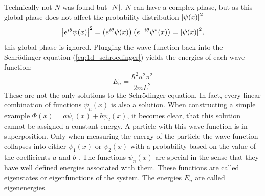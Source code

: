		Technically not $N$ was found but $\abs{N}$. $N$ can have a complex phase, but as this global phase does not affect the probability distribution $\abs{\psi(x)}^2$
		\begin{equation}
			\label{eq:global_phase}
			\abs{e^{i\theta}\psi(x)}^2=\left(e^{i\theta}\psi(x)\right)\left(e^{-i\theta}\psi^*(x)\right)=\abs{\psi(x)}^2,
		\end{equation}
		this global phase is ignored. Plugging the wave function back into the Schrödinger equation (\ref{eq:1d_schroedinger}) yields the energies of each wave function:
		\begin{equation}
			\label{eq:box_eigenenergies}
			E_n=\frac{\hbar^2n^2\pi^2}{2mL^2}
		\end{equation}
		These are not the only solutions to the Schrödinger equation.
		In fact, every linear combination of functions $\psi_n(x)$ is also a solution.
		When constructing a simple example $\Phi(x)=a\psi_1(x)+b\psi_2(x)$, it becomes clear, that this solution cannot be assigned a constant energy.
		A particle with this wave function is in superposition. Only when measuring the energy of the particle the wave function collapses into either $\psi_1(x)$ or $\psi_2(x)$ with a probability based on the value of the coefficients $a$ and $b$ \cite{Sakurai2020-lj}.
		The functions $\psi_n(x)$ are special in the sense that they have well defined energies associated with them.
		These functions are called eigenstates or eigenfunctions of the system. The energies $E_n$ are called eigenenergies.
